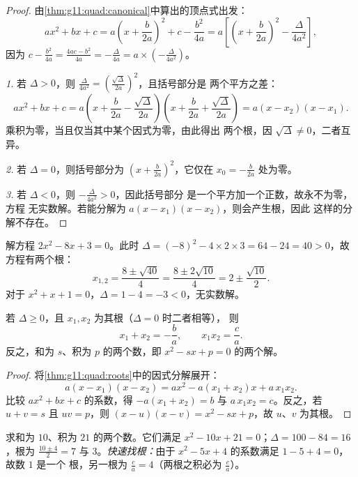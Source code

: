 \begin{proof}
由\cref{thm:g11:quad:canonical}中算出的顶点式出发：
\[
ax^2+bx+c
= a\left(x + \frac{b}{2a}\right)^2 + c - \frac{b^2}{4a}
= a\left[\left(x + \frac{b}{2a}\right)^2 - \frac{\Delta}{4a^2}\right],
\]
因为 $c - \frac{b^2}{4a} = \frac{4ac - b^2}{4a} = -\frac{\Delta}{4a} =
a \times \left(-\frac{\Delta}{4a^2}\right)$。

\emph{1.} 若 $\Delta > 0$，则 $\frac{\Delta}{4a^2} =
\left(\frac{\sqrt\Delta}{2a}\right)^2$，且括号部分是
两个平方之差：
\[
ax^2+bx+c = a\left(x + \frac{b}{2a} - \frac{\sqrt\Delta}{2a}\right)
\left(x + \frac{b}{2a} + \frac{\sqrt\Delta}{2a}\right)
= a(x - x_2)(x - x_1).
\]
乘积为零，当且仅当其中某个因式为零，由此得出
两个根，因 $\sqrt\Delta \neq 0$，二者互异。

\emph{2.} 若 $\Delta = 0$，则括号部分为
$\left(x + \frac{b}{2a}\right)^2$，它仅在
$x_0 = -\frac{b}{2a}$ 处为零。

\emph{3.} 若 $\Delta < 0$，则 $-\frac{\Delta}{4a^2} > 0$，因此括号部分
是一个平方加一个正数，故永不为零，方程
无实数解。若能分解为 $a(x-x_1)(x-x_2)$，则会产生根，因此
这样的分解不存在。
\end{proof}

\begin{example}\label{ex:g11:quad:solving}
解方程 $2x^2 - 8x + 3 = 0$。此时 $\Delta = (-8)^2 - 4 \times 2 \times 3 =
64 - 24 = 40 > 0$，故方程有两个根：
\[
x_{1,2} = \frac{8 \pm \sqrt{40}}{4} = \frac{8 \pm 2\sqrt{10}}{4}
= 2 \pm \frac{\sqrt{10}}{2}.
\]
对于 $x^2 + x + 1 = 0$，$\Delta = 1 - 4 = -3 < 0$，无实数解。
\end{example}

\begin{proposition}[根的和与积]\label{prop:g11:quad:vieta}
若 $\Delta \geq 0$，且 $x_1, x_2$ 为其根（$\Delta = 0$ 时二者相等），
则
\[
x_1 + x_2 = -\frac{b}{a},
\qquad
x_1 x_2 = \frac{c}{a} .
\]
反之，和为 $s$、积为 $p$ 的两个数，即
$x^2 - sx + p = 0$ 的两个解。
\end{proposition}

\begin{proof}
将\cref{thm:g11:quad:roots}中的因式分解展开：
\[
a(x - x_1)(x - x_2) = a x^2 - a(x_1 + x_2)x + a\,x_1 x_2 .
\]
比较 $ax^2 + bx + c$ 的系数，得
$-a(x_1+x_2) = b$ 与 $a\,x_1x_2 = c$。反之，若 $u + v = s$ 且
$uv = p$，则 $(x-u)(x-v) = x^2 - sx + p$，故 $u$、$v$ 为其根。
\end{proof}

\begin{example}
求和为 $10$、积为 $21$ 的两个数。它们满足
$x^2 - 10x + 21 = 0$；$\Delta = 100 - 84 = 16$，根为
$\frac{10 \pm 4}{2} = 7$ 与 $3$。\emph{快速找根：}由于
$x^2 - 5x + 4$ 的系数满足 $1 - 5 + 4 = 0$，故数 $1$ 是一个
根，另一根为 $\frac{c}{a} = 4$（两根之积必为
$\frac ca$）。
\end{example}

